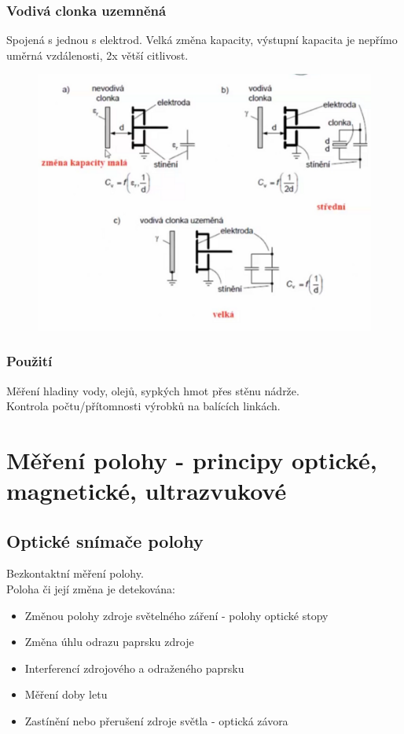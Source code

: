\subsubsection*{Vodivá clonka uzemněná}
Spojená s jednou s elektrod. Velká změna kapacity, výstupní kapacita je nepřímo uměrná vzdálenosti, 2x větší citlivost.\\

\begin{figure}[h!]
    \centering
    \includegraphics[scale = 0.2]{img/VariantyCpol.png}
\end{figure}
\subsubsection{Použití}
Měření hladiny vody, olejů, sypkých hmot přes stěnu nádrže.\\
Kontrola počtu/přítomnosti výrobků na balících linkách.\\


\section{Měření polohy - principy optické, magnetické, ultrazvukové}
\subsection{Optické snímače polohy}
Bezkontaktní měření polohy.\\
Poloha či její změna je detekována:
\begin{itemize}
    \item Změnou polohy zdroje světelného záření - polohy optické stopy
    \item Změna úhlu odrazu paprsku zdroje
    \item Interferencí zdrojového a odraženého paprsku
    \item Měření doby letu
    \item Zastínění nebo přerušení zdroje světla - optická závora
\end{itemize}

